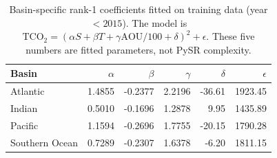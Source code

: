 \begin{table}[htbp]
\centering
\caption{Basin-specific rank-1 coefficients fitted on training data (year $<2015$). The model is $\mathrm{TCO}_2=(\alpha S+\beta T+\gamma\mathrm{AOU}/100+\delta)^2+\epsilon$. These five numbers are fitted parameters, not PySR complexity.}
\label{tab:coefficients}
\begin{tabular}{lrrrrr}
\toprule
Basin & $\alpha$ & $\beta$ & $\gamma$ & $\delta$ & $\epsilon$ \\
\midrule
Atlantic & 1.4855 & -0.2377 & 2.2196 & -36.61 & 1923.45 \\
Indian & 0.5010 & -0.1696 & 1.2878 & 9.95 & 1435.89 \\
Pacific & 1.1594 & -0.2696 & 1.7755 & -20.15 & 1790.28 \\
Southern Ocean & 0.7289 & -0.2307 & 1.6378 & -6.20 & 1811.15 \\
\bottomrule
\end{tabular}
\end{table}
